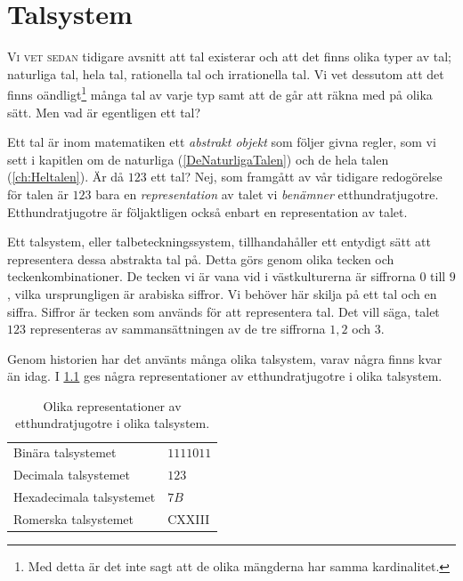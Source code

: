 \chapter{Talsystem}%
%
\label{ch:Talsystem}
\lettrine{V}{i vet sedan} tidigare avsnitt att tal existerar och att det finns
olika typer av tal; naturliga tal, hela tal, rationella tal och irrationella
tal.
Vi vet dessutom att det finns oändligt\footnote{Med detta är det inte sagt att
de olika mängderna har samma kardinalitet.} många tal av varje typ samt att de
går att räkna med på olika sätt.
Men vad är egentligen ett tal?

Ett tal är inom matematiken ett \emph{abstrakt objekt} som följer givna regler,
som vi sett i kapitlen om de naturliga (\cref{DeNaturligaTalen}) och de hela 
talen (\cref{ch:Heltalen}).
Är då \(123\) ett tal?
Nej, som framgått av vår tidigare redogörelse för talen är \(123\) bara en 
\emph{representation} av talet vi \emph{benämner} etthundratjugotre.
Etthundratjugotre är följaktligen också enbart en representation av talet.

Ett talsystem, eller
talbeteckningssystem, tillhandahåller ett entydigt
sätt att representera dessa abstrakta tal på.
Detta görs genom olika tecken och teckenkombinationer.
De tecken vi är vana vid i västkulturerna är siffrorna \(0\) till \(9\), vilka 
ursprungligen är arabiska siffror.
Vi behöver här skilja på ett tal och en siffra.
Siffror är tecken som används för att representera tal.
Det vill säga, talet \(123\) representeras av sammansättningen av de tre
siffrorna \(1,2\) och \(3\).

Genom historien har det använts många olika talsystem, varav några finns kvar
än idag.
I \cref{tbl:OlikaEtthundratjugotre} ges några representationer av
etthundratjugotre i olika talsystem.

\begin{table}
  \caption{%
    Olika representationer av etthundratjugotre i olika talsystem.
  }\label{tbl:OlikaEtthundratjugotre}
  \begin{tabular}{ll}
    \toprule
    Binära talsystemet & \(1111011\) \\
    Decimala talsystemet & \(123\) \\
    Hexadecimala talsystemet & \(7B\) \\
    Romerska talsystemet & CXXIII \\
    \bottomrule
  \end{tabular}
\end{table}

